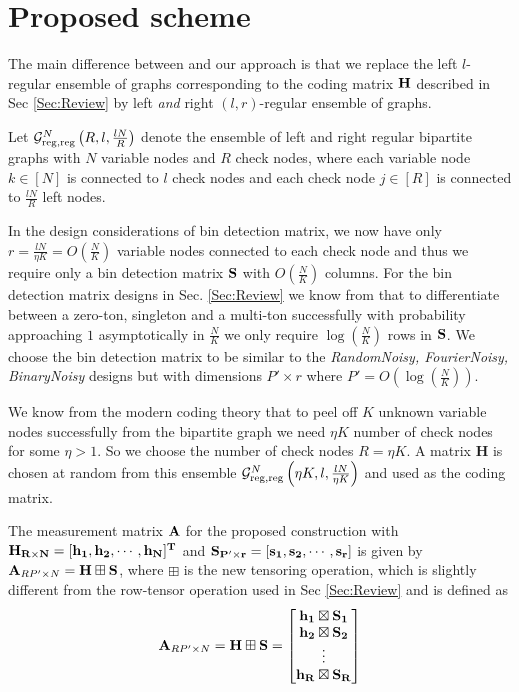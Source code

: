 \section{Proposed scheme}
The main difference between \cite{li2015subdraft} and our approach is that we replace the left $l$-regular ensemble of graphs corresponding to the coding matrix $\mathbf{H}$ described in Sec \ref{Sec:Review} by left {\em and} right $\left(l, r\right)$-regular ensemble of graphs.

\begin{definition}\label{def:leftandrighreg}
Let $\mathcal{G}^N_{\rm reg,reg}\left(R,l, \frac{lN}{R} \right)$ denote the ensemble of left and right regular bipartite graphs with $N$ variable nodes and $R$ check nodes, where each variable node $k \in [N]$ is connected to $l$ check nodes and each check node $j \in [R]$ is connected to $\frac{lN}{R}$ left nodes.
\end{definition}
In the design considerations of bin detection matrix, we now have only $r=\frac{lN}{\eta K}=O\left(\frac{N}{K}\right)$ variable nodes connected to each check node and thus we require only a bin detection matrix $\mathbf{S}$ with $O(\frac{N}{K})$ columns. For the bin detection matrix designs in Sec. \ref{Sec:Review} we know from \cite{li2015subdraft} that to differentiate between a zero-ton, singleton and a multi-ton successfully with probability approaching $1$ asymptotically in $\frac{N}{K}$ we only require $\log(\frac{N}{K})$ rows in $\mathbf{S}$. We choose the bin detection matrix to be similar to the \emph{RandomNoisy, FourierNoisy, BinaryNoisy} designs but with dimensions $P'\times r$ where $P'=O\left(\log(\frac{N}{K})\right)$.

We know from the modern coding theory that to peel off $K$ unknown variable nodes successfully from the bipartite graph we need $\eta K$ number of check nodes for some $\eta>1$. So we choose the number of check nodes $R = \eta K$. A matrix $\mathbf{H}$ is chosen at random from this ensemble $\mathcal{G}^N_{\rm reg,reg}\left(\eta K,l, \frac{lN}{\eta K} \right)$ and used as the coding matrix.

The measurement matrix $\bf A$ for the proposed construction with $\bf H_{R \times N} = [h_1, h_2, \cdots, h_N]^{T}$ and $\bf S_{P' \times r}= [s_1, s_2, \cdots ,s_r]$ is given by $ {\bf A}_{RP' \times N} = {\bf H \boxplus S }$,
 where $ \boxplus$ is the new tensoring operation, which is slightly different from the row-tensor operation used in Sec \ref{Sec:Review} and is defined as
  \[ {\bf A}_{RP' \times N} = {\bf H \boxplus S } = \begin{bmatrix} \bf
 h_1 \boxtimes S_1 \\ \bf
 h_2 \boxtimes S_2 \\ \bf
 \vdots\\ \bf
 h_R \boxtimes S_R  \bf
\end{bmatrix}  \]

